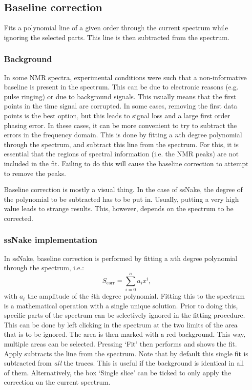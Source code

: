 \documentclass[11pt,a4paper]{article}
\begin{document}
\subsection{Baseline correction}
Fits a polynomial line of a given order through the current spectrum while ignoring the selected parts. This line is then subtracted from the spectrum.

\subsubsection*{Background}
In some NMR spectra, experimental conditions were such that a non-informative baseline is present in the spectrum. This can be due to electronic reasons (e.g. pulse ringing) or due to background signals. This usually means that the first points in the time signal are corrupted. In some cases, removing the first data points is the best option, but this leads to signal loss and a large first order phasing error. In these cases, it can be more convenient to try to subtract the errors in the frequency domain. This is done by fitting a $n$th degree polynomial through  the spectrum, and subtract this line from the spectrum. For this, it is essential that the regions of spectral information (i.e. the NMR peaks) are not included in the fit. Failing to do this will cause the baseline correction to attempt to remove the peaks. 

Baseline correction is mostly a visual thing. In the case of ssNake, the degree of the polynomial to be subtracted has to be put in. Usually, putting a very high value leads to strange results. This, however, depends on the spectrum to be corrected.

\subsubsection*{ssNake implementation}
In ssNake, baseline correction is performed by fitting a $n$th degree polynomial through the spectrum, i.e.:
\begin{equation*}
S_\text{corr} = \sum_{i=0}^n a_i x^i ,
\end{equation*}
with $a_i$ the amplitude of the $i$th degree polynomial. Fitting this to the spectrum is a mathematical operation with a single unique solution. Prior to doing this, specific parts of the spectrum can be selectively ignored in the fitting procedure. This can be done by left clicking in the spectrum at the two limits of the area that is to be ignored. The area is then marked with a red background. This way, multiple areas can be selected. Pressing  `Fit' then performs and shows the fit. Apply subtracts the line from the spectrum. Note that by default this single fit is subtracted from \textit{all} the traces. This is useful if the background is identical in all of them. Alternatively, the box `Single slice' can be ticked to only apply the correction on the current spectrum.
\end{document}
